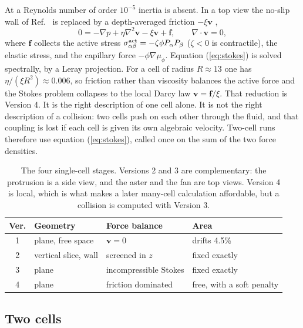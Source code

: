 \documentclass[11pt]{article}
\begin{document}
At a Reynolds number of order $10^{-5}$ inertia is absent. In a top view the no-slip wall of Ref.~\cite{Tjhung:2015} is replaced by a depth-averaged friction $-\xi\mathbf{v}$ \cite{Leoni:2017,Ziebert:2013},
\begin{equation}\label{eq:stokes}
0=-\nabla p+\eta\nabla^{2}\mathbf{v}-\xi\mathbf{v}+\mathbf{f},\qquad\nabla\cdot\mathbf{v}=0,
\end{equation}
where $\mathbf{f}$ collects the active stress $\sigma^{\rm act}_{\alpha\beta}=-\zeta\phi P_{\alpha}P_{\beta}$ ($\zeta<0$ is contractile), the elastic stress, and the capillary force $-\phi\nabla\mu_{\phi}$. Equation (\ref{eq:stokes}) is solved spectrally, by a Leray projection. For a cell of radius $R\approx 13$ one has $\eta/(\xi R^{2})\approx 0.006$, so friction rather than viscosity balances the active force and the Stokes problem collapses to the local Darcy law $\mathbf{v}=\mathbf{f}/\xi$. That reduction is Version 4. It is the right description of one cell alone. It is not the right description of a collision: two cells push on each other through the fluid, and that coupling is lost if each cell is given its own algebraic velocity. Two-cell runs therefore use equation (\ref{eq:stokes}), called once on the sum of the two force densities.

\begin{table}[ht!]
\begin{center}
\begin{tabular}{|c|l|l|l|}
\hline
Ver. & Geometry & Force balance & Area \\
\hline
1 & plane, free space & $\mathbf{v}=0$ & drifts 4.5\% \\
2 & vertical slice, wall & screened in $z$ & fixed exactly \\
3 & plane & incompressible Stokes & fixed exactly \\
4 & plane & friction dominated & free, with a soft penalty \\
\hline
\end{tabular}
\end{center}
\caption{The four single-cell stages. Versions 2 and 3 are complementary: the protrusion is a side view, and the aster and the fan are top views. Version 4 is local, which is what makes a later many-cell calculation affordable, but a collision is computed with Version 3.}
\label{tab:stages}
\end{table}

\subsection{Two cells}
\label{sec:twocell}
\end{document}
